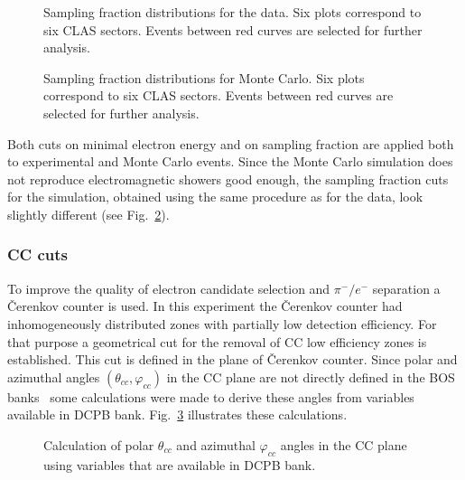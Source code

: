 \begin{figure}[htp]
\begin{center}
\caption{\small Sampling fraction distributions for the data. Six plots correspond to six CLAS sectors. Events between red curves are selected for further analysis.} \label{fig:ec_cut_data}
\end{center}
\end{figure}

\begin{figure}[htp]
\begin{center}
\caption{\small  Sampling fraction distributions for Monte Carlo. Six plots correspond to six CLAS sectors. Events between red curves are selected for further analysis.} \label{fig:ec_cut_sim}
\end{center}
\end{figure}

Both cuts on minimal electron energy and on sampling fraction are applied
both to experimental and Monte Carlo events. Since the Monte Carlo simulation does not reproduce electromagnetic showers good enough, the sampling fraction cuts for the simulation, obtained using the same procedure as for the data, look slightly different (see Fig.~\ref{fig:ec_cut_sim}).

 

\subsubsection{CC cuts}
\label{cc_cuts} 

To improve the quality of electron candidate selection and $\pi^{-}/e^{-}$ separation a \v Cerenkov counter is used. In this experiment the \v Cerenkov counter had inhomogeneously distributed zones with partially low detection efficiency. For that purpose a geometrical cut for the removal of CC low efficiency zones is established. This cut is defined in the plane of \v Cerenkov counter. 
Since polar and azimuthal angles $(\theta_{cc},\varphi_{cc})$ in the CC plane are not directly defined in the BOS banks~\cite{BOS:bank} some calculations were made to derive these angles from variables available in DCPB bank. Fig.~\ref{fig:cc_plane_def} illustrates these calculations.

\begin{figure}[htp]
\begin{center}
\caption{\small  Calculation of polar $\theta_{cc}$ and azimuthal $\varphi_{cc}$  angles in the CC plane using variables that are available in DCPB bank.} \label{fig:cc_plane_def}
\end{center}
\end{figure}

